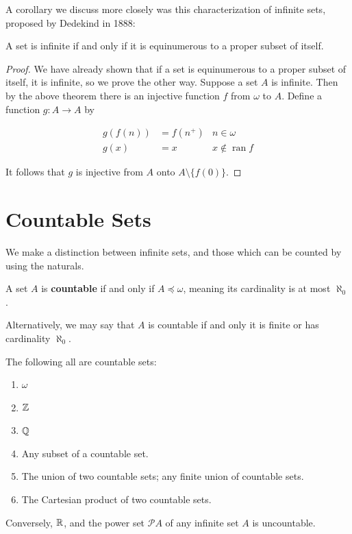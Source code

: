 A corollary we discuss more closely was this characterization of infinite sets, proposed by Dedekind in 1888:

\begin{corollary}
    A set is infinite if and only if it is equinumerous to a proper subset of itself. 
\end{corollary}

\begin{proof}
    We have already shown that if a set is equinumerous to a proper subset of itself, it is infinite, so we prove the other way. Suppose a set $A$ is infinite. Then by the above theorem there is an injective function $f$ from $\omega$ to $A$. Define a function $g: A \to A$ by 

    \begin{align*}
        g(f(n)) & = f(n^+) & n \in \omega \\
        g(x) & = x & x \notin \operatorname{ran}f
    \end{align*}

    It follows that $g$ is injective from $A$ onto $A \setminus \{f(0)\}$. 
\end{proof}

\section{Countable Sets}

We make a distinction between infinite sets, and those which can be counted by using the naturals. 

\begin{definition}
    A set $A$ is \textbf{countable} if and only if $A \preceq \omega$, meaning its cardinality is at most $\aleph_0$. 
\end{definition}

Alternatively, we may say that $A$ is countable if and only it is finite or has cardinality $\aleph_0$. 

\begin{example}
    The following all are countable sets:

    \begin{enumerate}
        \item $\omega$
        \item $\mathbb{Z}$
        \item $\mathbb{Q}$
        \item Any subset of a countable set. 
        \item The union of two countable sets; any finite union of countable sets.
        \item The Cartesian product of two countable sets. 
    \end{enumerate}

    Conversely, $\mathbb{R}$, and the power set $\mathcal{P}A$ of any infinite set $A$ is uncountable. 
\end{example}

